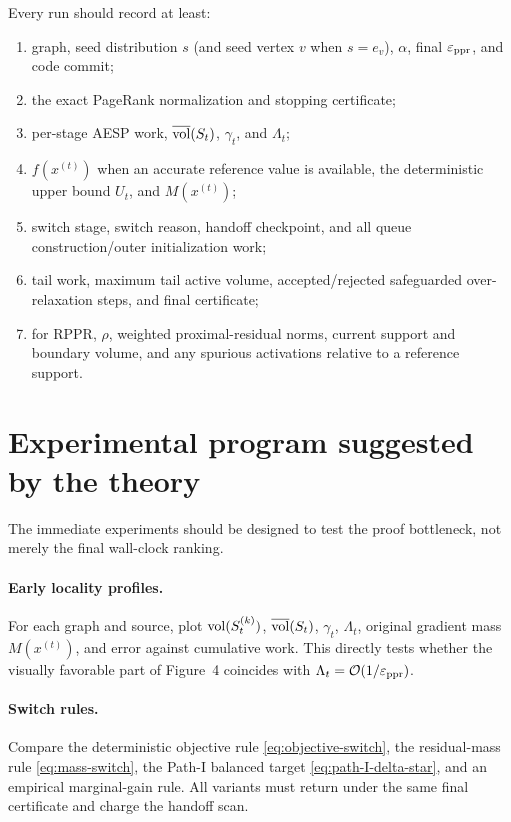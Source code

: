 Every run should record at least:
\begin{enumerate}[label=(\alph*),leftmargin=2em]
  \item graph, seed distribution $s$ (and seed vertex $v$ when $s=e_v$),
        $\alpha$, final $\varepsilon_{\mathrm{ppr}}$, and code commit;
  \item the exact PageRank normalization and stopping certificate;
  \item per-stage AESP work, $\overline{\operatorname{vol}}(S_t)$, $\gamma_t$, and
        $\Lambda_t$;
  \item $f(x^{(t)})$ when an accurate reference value is available, the
        deterministic upper bound $U_t$, and $M(x^{(t)})$;
  \item switch stage, switch reason, handoff checkpoint, and all queue
        construction/outer initialization work;
  \item tail work, maximum tail active volume, accepted/rejected safeguarded
        over-relaxation steps, and final certificate;
  \item for RPPR, $\rho$, weighted proximal-residual norms, current support and
        boundary volume, and any spurious activations relative to a reference
        support.
\end{enumerate}

\section{Experimental program suggested by the theory}
\label{sec:experiments}

The immediate experiments should be designed to test the proof bottleneck,
not merely the final wall-clock ranking.

\paragraph{Early locality profiles.}
For each graph and source, plot
$\operatorname{vol}(S_t^{(k)})$, $\overline{\operatorname{vol}}(S_t)$, $\gamma_t$, $\Lambda_t$, original
gradient mass $M(x^{(t)})$, and error against cumulative work. This directly
tests whether the visually favorable part of Figure~4 coincides with
$\Lambda_t=\mathcal{O}(1/\varepsilon_{\mathrm{ppr}})$.

\paragraph{Switch rules.}
Compare the deterministic objective rule \cref{eq:objective-switch}, the
residual-mass rule \cref{eq:mass-switch}, the Path-I balanced target
\cref{eq:path-I-delta-star}, and an empirical marginal-gain rule. All variants
must return under the same final certificate and charge the handoff scan.

